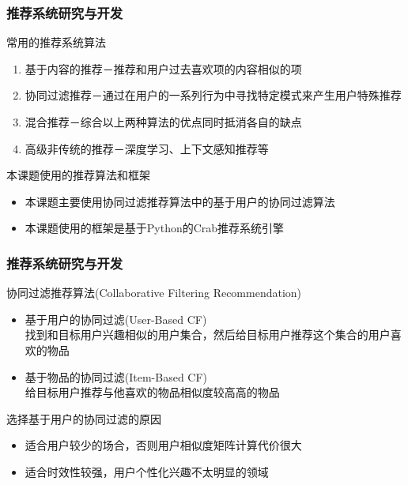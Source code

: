 \documentclass{beamer}
\begin{document}
\begin{frame}
\frametitle{\cite{crab1}推荐系统研究与开发}
  \begin{block}{常用的推荐系统算法}
    \begin{enumerate}
      \item 基于内容的推荐－推荐和用户过去喜欢项的内容相似的项
      \item 协同过滤推荐－通过在用户的一系列行为中寻找特定模式来产生用户特殊推荐
      \item 混合推荐－综合以上两种算法的优点同时抵消各自的缺点
      \item 高级非传统的推荐－深度学习、上下文感知推荐等
    \end{enumerate}
  \end{block}
  \pause
  \begin{block}{本课题使用的推荐算法和框架}
    \begin{itemize}
      \item 本课题主要使用协同过滤推荐算法中的基于用户的协同过滤算法
      \item \cite{crab2}本课题使用的框架是基于Python的Crab推荐系统引擎
    \end{itemize}
  \end{block}
\end{frame}

\begin{frame}
\frametitle{推荐系统研究与开发}
  \begin{block}{协同过滤推荐算法(Collaborative Filtering Recommendation)}
    \begin{itemize}
      \item 基于用户的协同过滤(User-Based CF)\\
      找到和目标用户兴趣相似的用户集合，然后给目标用户推荐这个集合的用户喜欢的物品
      \item 基于物品的协同过滤(Item-Based CF)\\
      给目标用户推荐与他喜欢的物品相似度较高高的物品\\
    \end{itemize}
  \end{block}
  \pause
  \begin{block}{选择基于用户的协同过滤的原因}
    \begin{itemize}
      \item 适合用户较少的场合，否则用户相似度矩阵计算代价很大
      \item 适合时效性较强，用户个性化兴趣不太明显的领域
    \end{itemize}
  \end{block}
\end{frame}
\end{document}
